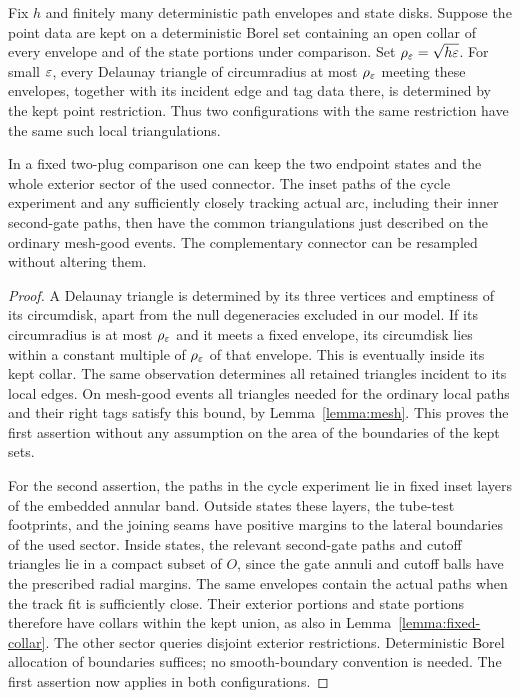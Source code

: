 \par\ifdim\dimexpr\pagegoal-\pagetotal\relax<6\baselineskip\newpage\fi
\begin{lemma}\label{lemma:retained-collar}
Fix $h$ and finitely many deterministic path envelopes and state disks.
Suppose the point data are kept on a deterministic Borel set containing
an open collar of every envelope and of the state portions under
comparison.  Set $\rho_\varepsilon=\sqrt{h\varepsilon}$.  For small $\varepsilon$, every
Delaunay triangle of circumradius at most $\rho_\varepsilon$ meeting these
envelopes, together with its incident edge and tag data there, is
determined by the kept point restriction.  Thus two configurations
with the same restriction have the same such local triangulations.

In a fixed two-plug comparison one can keep the two endpoint states and
the whole exterior sector of the used connector.  The inset paths of
the cycle experiment and any sufficiently closely tracking actual
arc, including their inner second-gate paths, then have the common
triangulations just described on the ordinary mesh-good events.  The
complementary connector can be resampled without altering them.
\end{lemma}

\begin{proof}
A Delaunay triangle is determined by its three vertices and emptiness
of its circumdisk, apart from the null degeneracies excluded in our
model.  If its circumradius is at most $\rho_\varepsilon$ and it meets a fixed
envelope, its circumdisk lies within a constant multiple of
$\rho_\varepsilon$ of that envelope.  This is eventually inside its kept
collar.  The same observation determines all retained triangles
incident to its local edges.  On mesh-good events all triangles
needed for the ordinary local paths and their right tags satisfy this
bound, by Lemma~\ref{lemma:mesh}.  This proves the first assertion
without any assumption on the area of the boundaries of the kept
sets.

For the second assertion, the paths in the cycle experiment lie in
fixed inset layers of the embedded annular band.  Outside states these
layers, the tube-test footprints, and the joining seams have positive
margins to the lateral boundaries of the used sector.  Inside states,
the relevant second-gate paths and cutoff triangles lie in a compact
subset of $O$, since the gate annuli and cutoff balls have the
prescribed radial margins.  The same envelopes contain the actual
paths when the track fit is sufficiently close.  Their exterior
portions and state portions therefore have collars within the kept
union, as also in Lemma~\ref{lemma:fixed-collar}.  The other sector
queries disjoint exterior restrictions.  Deterministic Borel
allocation of boundaries suffices; no smooth-boundary convention is
needed.  The first assertion now applies in both configurations.
\end{proof}

